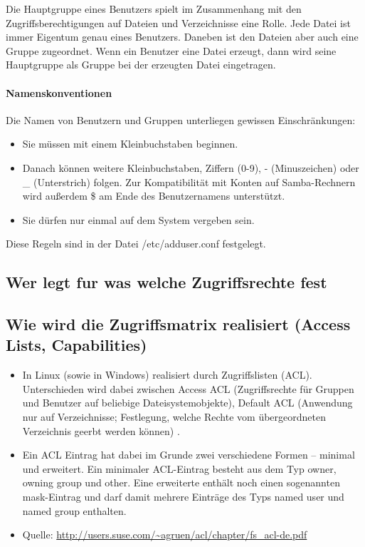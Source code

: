 \documentclass{scrartcl}
\begin{document}
Die Hauptgruppe eines Benutzers spielt im Zusammenhang mit den
Zugriffsberechtigungen auf Dateien und Verzeichnisse eine Rolle. Jede Datei ist
immer Eigentum genau eines Benutzers. Daneben ist den Dateien aber auch eine
Gruppe zugeordnet. Wenn ein Benutzer eine Datei erzeugt, dann wird seine
Hauptgruppe als Gruppe bei der erzeugten Datei eingetragen.


\paragraph{Namenskonventionen}
Die Namen von Benutzern und Gruppen unterliegen gewissen Einschränkungen:
\begin{itemize}
  \item Sie müssen mit einem Kleinbuchstaben beginnen.
  \item Danach können weitere Kleinbuchstaben, Ziffern (0-9), - (Minuszeichen)
    oder _ (Unterstrich) folgen. Zur Kompatibilität mit Konten auf
    Samba-Rechnern wird außerdem \$ am Ende des Benutzernamens unterstützt.
  \item Sie dürfen nur einmal auf dem System vergeben sein.
\end{itemize}
Diese Regeln sind in der Datei /etc/adduser.conf festgelegt.

\subsection*{Wer legt fur was welche Zugriffsrechte fest}
\subsection*{Wie wird die Zugriffsmatrix realisiert (Access Lists, Capabilities)}

\begin{itemize}
  \item In Linux (sowie in Windows) realisiert durch Zugriffslisten (ACL). Unterschieden wird 
  dabei zwischen Access ACL (Zugriffsrechte für Gruppen und Benutzer auf beliebige Dateisystemobjekte), 
  Default ACL (Anwendung nur auf Verzeichnisse; Festlegung, welche Rechte vom übergeordneten
  Verzeichnis geerbt werden können) .
  \item Ein ACL Eintrag hat dabei im Grunde zwei verschiedene Formen – minimal und erweitert. Ein 
  minimaler ACL-Eintrag besteht aus dem Typ owner, owning group und other. Eine erweiterte enthält 
  noch einen sogenannten mask-Eintrag und darf damit mehrere Einträge des Typs named user und named 
  group enthalten.
  \item Quelle: \url{http://users.suse.com/~agruen/acl/chapter/fs_acl-de.pdf}
\end{itemize}
\end{document}
